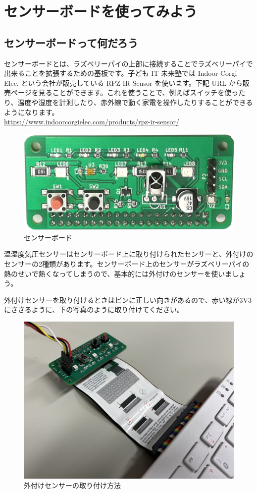 \section{センサーボードを使ってみよう}
\subsection{センサーボードって何だろう}

センサーボードとは、ラズベリーパイの上部に接続することでラズベリーパイで出来ることを拡張するための基板です。子ども IT 未来塾では Indoor Corgi Elec. という会社が販売している RPZ-IR-Sensor を使います。下記 URL から販売ページを見ることができます。これを使うことで、例えばスイッチを使ったり、温度や湿度を計測したり、赤外線で動く家電を操作したりすることができるようになります。\\
\url{https://www.indoorcorgielec.com/products/rpz-ir-sensor/}\\

\begin{figure}[H]
    \centering
    \includegraphics[width=0.6\linewidth]{images/chap03/text03-img030.png}
    \caption{センサーボード}
\end{figure}

温湿度気圧センサーはセンサーボード上に取り付けられたセンサーと、外付けのセンサーの2種類があります。センサーボード上のセンサーがラズベリーパイの熱のせいで熱くなってしまうので、基本的には外付けのセンサーを使いましょう。

外付けセンサーを取り付けるときはピンに正しい向きがあるので、赤い線が3V3にささるように、下の写真のように取り付けてください。

\begin{figure}[H]
    \centering
    \includegraphics[width=0.6\linewidth]{images/chap03/how_to_install_bme280.jpg}
    \caption{外付けセンサーの取り付け方法}
\end{figure}

